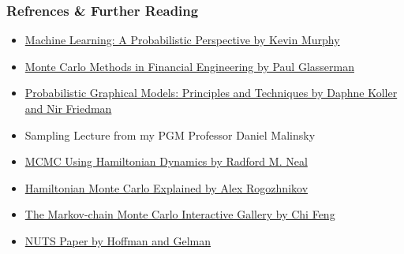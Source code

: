 \documentclass{beamer}
\begin{document}
\begin{frame}
\frametitle{Refrences \& Further Reading}
  \begin{itemize}
    \item \href{https://www.cs.ubc.ca/~murphyk/MLbook/}{Machine Learning: A Probabilistic Perspective by Kevin Murphy}
    \item \href{https://www.springer.com/gp/book/9780387004518}{Monte Carlo Methods in Financial Engineering by Paul Glasserman}
    \item \href{https://mitpress.mit.edu/books/probabilistic-graphical-models}{Probabilistic Graphical Models: Principles and Techniques by Daphne Koller and Nir Friedman}
    \item Sampling Lecture from my PGM Professor Daniel Malinsky
    \item \href{http://www.mcmchandbook.net/HandbookChapter5.pdf}{MCMC Using Hamiltonian Dynamics by Radford M. Neal}
    \item \href{http://arogozhnikov.github.io/2016/12/19/markov_chain_monte_carlo.html}{Hamiltonian Monte Carlo Explained by Alex Rogozhnikov}
    \item \href{https://chi-feng.github.io/mcmc-demo/app.html}{The Markov-chain Monte Carlo Interactive Gallery by Chi Feng}
    \item \href{http://www.stat.columbia.edu/~gelman/research/published/nuts.pdf}{NUTS Paper by Hoffman and Gelman}
  \end{itemize}
\end{frame}


\end{document}
